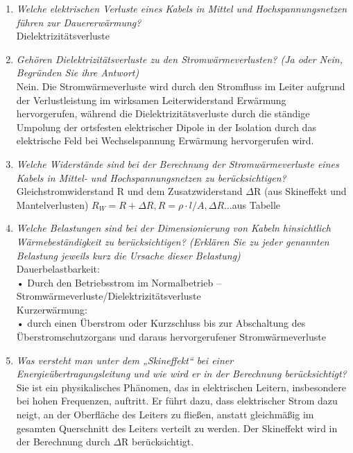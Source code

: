 \documentclass[12pt]{article}
\begin{document}
\begin{enumerate}
    \item \textit{Welche elektrischen Verluste eines Kabels in Mittel und Hochspannungsnetzen führen zur 
    Dauererwärmung? }\\
    Dielektrizitätsverluste
    \item \textit{Gehören Dielektrizitätsverluste zu den 
    Stromwärmeverlusten? (Ja oder Nein, Begründen 
    Sie ihre Antwort)}\\
    Nein. Die Stromwärmeverluste wird durch den Stromfluss im Leiter aufgrund der Verlustleistung im wirksamen 
    Leiterwiderstand Erwärmung hervorgerufen, während die Dielektrizitätsverluste durch die ständige Umpolung 
    der ortsfesten elektrischer Dipole in der Isolation durch das elektrische Feld bei Wechselspannung 
    Erwärmung hervorgerufen wird. 
    \item \textit{Welche Widerstände sind bei der Berechnung der 
    Stromwärmeverluste eines Kabels in Mittel- und 
    Hochspannungsnetzen zu berücksichtigen?}\\
    Gleichstromwiderstand R und dem Zusatzwiderstand $\Delta$R (aus Skineffekt und Mantelverlusten)
    $R_W = R + \Delta R, R= \rho \cdot l / A, \Delta R \dots $aus Tabelle

    \item \textit{Welche Belastungen sind bei der Dimensionierung 
    von Kabeln hinsichtlich Wärmebeständigkeit zu 
    berücksichtigen? 
    (Erklären Sie zu jeder genannten Belastung jeweils 
    kurz die Ursache dieser Belastung)}\\
    Dauerbelastbarkeit: \\
    • Durch den Betriebsstrom im Normalbetrieb – Stromwärmeverluste/Dielektrizitätsverluste \\
    Kurzerwärmung: \\
    • durch einen Überstrom oder Kurzschluss bis zur Abschaltung des Überstromschutzorgans und daraus 
    hervorgerufener Stromwärmeverluste\\

    \item \textit{Was versteht man unter dem „Skineffekt“ bei einer 
    Energieübertragungsleitung und wie wird er in der 
    Berechnung berücksichtigt?}\\
    Sie ist ein physikalisches Phänomen, das in elektrischen Leitern, insbesondere bei hohen Frequenzen, auftritt. 
    Er führt dazu, dass elektrischer Strom dazu neigt, an der Oberfläche des Leiters zu fließen, 
    anstatt gleichmäßig im gesamten Querschnitt des Leiters verteilt zu werden. 
    Der Skineffekt wird in der Berechnung durch $\Delta$R berücksichtigt. 



\end{enumerate}
\end{document}
